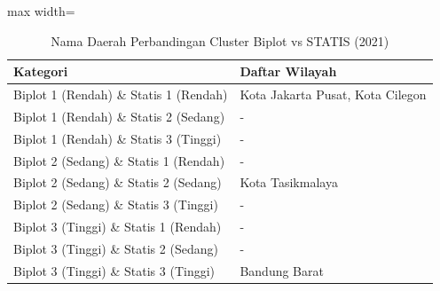 \begin{table}[H]
\centering
\caption{Nama Daerah Perbandingan Cluster Biplot vs STATIS (2021)} \label{tab:samplebiplot_statis_comp_name_2021}
\begin{adjustbox}{max width=\textwidth}
\begin{tabular}{|p{4cm}|p{10cm}|}
\hline
\textbf{Kategori} & \textbf{Daftar Wilayah} \\
\hline
Biplot 1 (Rendah) \& Statis 1 (Rendah) & Kota Jakarta Pusat, Kota Cilegon \\
\hline
Biplot 1 (Rendah) \& Statis 2 (Sedang) & - \\
\hline
Biplot 1 (Rendah) \& Statis 3 (Tinggi) & - \\
\hline
Biplot 2 (Sedang) \& Statis 1 (Rendah) & - \\
\hline
Biplot 2 (Sedang) \& Statis 2 (Sedang) & Kota Tasikmalaya \\
\hline
Biplot 2 (Sedang) \& Statis 3 (Tinggi) & - \\
\hline
Biplot 3 (Tinggi) \& Statis 1 (Rendah) & - \\
\hline
Biplot 3 (Tinggi) \& Statis 2 (Sedang) & - \\
\hline
Biplot 3 (Tinggi) \& Statis 3 (Tinggi) & Bandung Barat \\
\hline
\end{tabular}
\end{adjustbox}
\end{table}